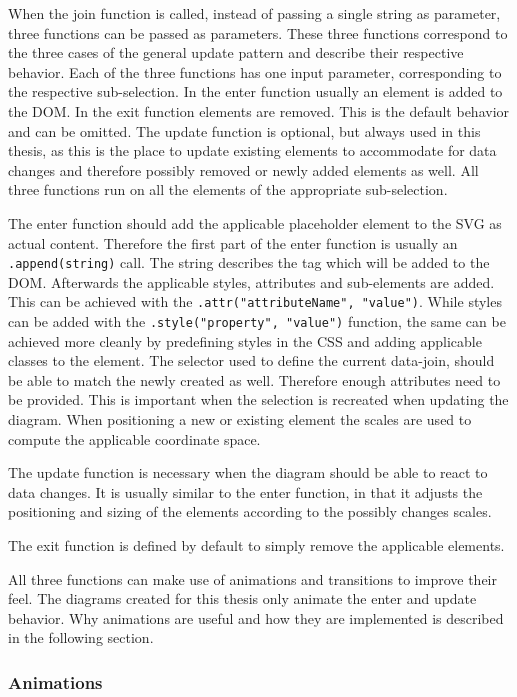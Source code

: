 When the join function is called, instead of passing a single string as parameter, three functions can be passed as parameters. These three functions correspond to the three cases of the general update pattern and describe their respective behavior. Each of the three functions has one input parameter, corresponding to the respective sub-selection. In the enter function usually an element is added to the DOM. In the exit function elements are removed. This is the default behavior and can be omitted. The update function is optional, but always used in this thesis, as this is the place to update existing elements to accommodate for data changes and therefore possibly removed or newly added elements as well. All three functions run on all the elements of the appropriate sub-selection.

The enter function should add the applicable placeholder element to the SVG as actual content. Therefore the first part of the enter function is usually an \texttt{.append(string)} call. The string describes the tag which will be added to the DOM. Afterwards the applicable styles, attributes and sub-elements are added. This can be achieved with the \texttt{.attr("attributeName", "value")}. While styles can be added with the \texttt{.style("property", "value")} function, the same can be achieved more cleanly by predefining styles in the CSS and adding applicable classes to the element. The selector used to define the current data-join, should be able to match the newly created as well. Therefore enough attributes need to be provided. This is important when the selection is recreated when updating the diagram. When positioning a new or existing element the scales are used to compute the applicable coordinate space.

The update function is necessary when the diagram should be able to react to data changes. It is usually similar to the enter function, in that it adjusts the positioning and sizing of the elements according to the possibly changes scales. 

The exit function is defined by default to simply remove the applicable elements.

All three functions can make use of animations and transitions to improve their feel. The diagrams created for this thesis only animate the enter and update behavior. Why animations are useful and how they are implemented is described in the following section.

\subsubsection{Animations}

